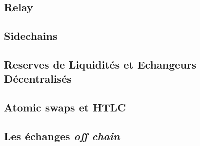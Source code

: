 % 

\subsection[Relay]{Relay}


\subsection[Sidechains]{Sidechains}


\subsection[Réserves de Liquidités et Echangeurs Décentralisés]{Reserves de Liquidités et Echangeurs Décentralisés}


\subsection[Atomic swaps et HTLC]{Atomic swaps et HTLC}


\subsection[Échanges "off chain"]{Les échanges \textit{off chain}}

